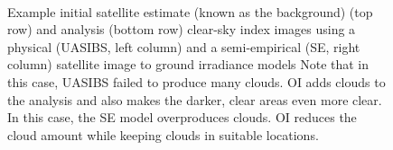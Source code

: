 \begin{figure}[htbp]
\centering
\captionsetup[subfigure]{labelformat=empty}
\vspace{-1em}\\
\caption[Improved satellite irradiance estimates using optimal
interpolation]{Example initial satellite estimate (known as the
  background) (top row) and analysis (bottom row) clear-sky index
  images using a physical (UASIBS, left column) and a semi-empirical
  (SE, right column) satellite image to ground irradiance models Note
  that in this case, UASIBS failed to produce many clouds. OI adds
  clouds to the analysis and also makes the darker, clear areas even
  more clear.  In this case, the SE model overproduces clouds. OI
  reduces the cloud amount while keeping clouds in suitable
  locations.}
\label{fig:oi_example}
\end{figure}

